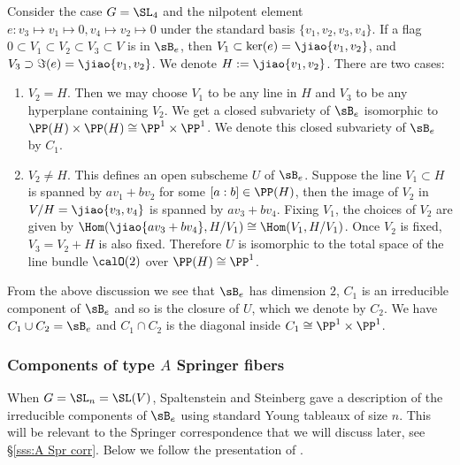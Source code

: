 \subsubsection{} Consider the case $G=\SL_{4}$ and the nilpotent element $e: v_{3}\mapsto v_{1}\mapsto 0, v_{4}\mapsto v_{2}\mapsto 0$ under the standard basis $\{v_{1},v_{2},v_{3},v_{4}\}$. If a flag $0\subset V_{1}\subset V_{2}\subset V_{3}\subset V$ is in $\sB_{e}$, then $V_{1}\subset \ker(e)=\jiao{v_{1},v_{2}}$, and $V_{3}\supset\Im(e)=\jiao{v_{1},v_{2}}$. We denote $H:=\jiao{v_{1},v_{2}}$. There are two cases:
\begin{enumerate}
\item $V_{2}=H$. Then we may choose $V_{1}$ to be any line in $H$ and $V_{3}$ to be any hyperplane containing $V_{2}$. We get a closed subvariety of $\sB_{e}$ isomorphic to $\PP(H)\times \PP(H)\cong \PP^{1}\times \PP^{1}$. We denote this closed subvariety of $\sB_{e}$ by $C_{1}$. 
\item $V_{2}\neq H$. This defines an open subscheme $U$ of $\sB_{e}$. Suppose the line $V_{1}\subset H$ is spanned by  $av_{1}+bv_{2}$ for some $[a:b]\in\PP(H)$, then the image of $V_{2}$ in $V/H=\jiao{v_{3},v_{4}}$ is spanned by $av_{3}+bv_{4}$. Fixing $V_{1}$, the choices of $V_{2}$ are given by $\Hom(\jiao{av_{3}+bv_{4}}, H/V_{1})\cong\Hom(V_{1},H/V_{1})$. Once $V_{2}$ is fixed, $V_{3}=V_{2}+H$ is also fixed. Therefore $U$ is isomorphic to the total space of the line bundle $\calO(2)$ over $\PP(H)\cong \PP^{1}$.
\end{enumerate}
From the above discussion we see that $\sB_{e}$ has dimension $2$, $C_{1}$ is an irreducible component of $\sB_{e}$ and so is the closure of $U$, which we denote by $C_{2}$. We have $C_{1}\cup C_{2}=\sB_{e}$ and $C_{1}\cap C_{2}$ is the diagonal inside $C_{1}\cong\PP^{1}\times\PP^{1}$. 
 
\subsubsection{Components of type $A$ Springer fibers}\label{sss:Spr type A} When $G=\SL_{n}=\SL(V)$, Spaltenstein \cite{Spa76} and Steinberg \cite[]{St} gave a description of the irreducible components of  $\sB_{e}$ using standard Young tableaux of size $n$. This will be relevant to the Springer correspondence that we will discuss later, see \S\ref{sss:A Spr corr}. Below we follow the presentation of \cite[Ch II, \S5]{Spaltenstein}.

